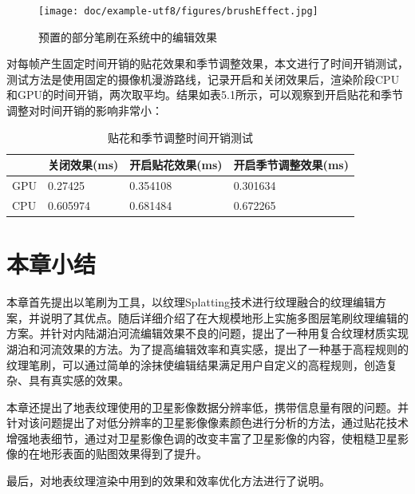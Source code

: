 \begin{figure}[H]
    \centering
    \texttt{[image: doc/example-utf8/figures/brushEffect.jpg]}
    \caption{预置的部分笔刷在系统中的编辑效果}
\end{figure}

对每帧产生固定时间开销的贴花效果和季节调整效果，本文进行了时间开销测试，测试方法是使用固定的摄像机漫游路线，记录开启和关闭效果后，渲染阶段CPU和GPU的时间开销，两次取平均。结果如表5.1所示，可以观察到开启贴花和季节调整对时间开销的影响非常小：
\begin{table}[h]
\caption{贴花和季节调整时间开销测试}  
\begin{tabularx}{15cm}{llll}  
\hline  
&关闭效果(ms)&开启贴花效果(ms)&开启季节调整效果(ms)\\
\hline
GPU& 0.27425&0.354108&0.301634 \\
\hline
CPU&0.605974&0.681484&0.672265    \\
\end{tabularx}  
\end{table}

\section{本章小结}
本章首先提出以笔刷为工具，以纹理Splatting技术进行纹理融合的纹理编辑方案，并说明了其优点。随后详细介绍了在大规模地形上实施多图层笔刷纹理编辑的方案。并针对内陆湖泊河流编辑效果不良的问题，提出了一种用复合纹理材质实现湖泊和河流效果的方法。为了提高编辑效率和真实感，提出了一种基于高程规则的纹理笔刷，可以通过简单的涂抹使编辑结果满足用户自定义的高程规则，创造复杂、具有真实感的效果。 \par
本章还提出了地表纹理使用的卫星影像数据分辨率低，携带信息量有限的问题。并针对该问题提出了对低分辨率的卫星影像像素颜色进行分析的方法，通过贴花技术增强地表细节，通过对卫星影像色调的改变丰富了卫星影像的内容，使粗糙卫星影像的在地形表面的贴图效果得到了提升。\par
最后，对地表纹理渲染中用到的效果和效率优化方法进行了说明。